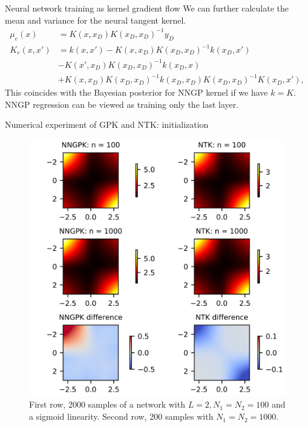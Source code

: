 \documentclass{beamer}
\begin{document}
\begin{frame}{Neural network training as kernel gradient flow}
	We can further calculate the mean and variance for the neural tangent kernel.
	\begin{equation*}\label{eqn:ensembleinfty}
\begin{aligned}
    \mu_e(x) &= K(x, x_D)K(x_D, x_D)^{-1}y_D\\
    K_e(x, x') &= k(x, x') - K(x, x_D)K(x_D, x_D)^{-1} k(x_D, x') \\
    & -  K(x', x_D) K(x_D, x_D)^{-1} k(x_D, x) \\
    & + K(x, x_D) K(x_D, x_D)^{-1}k(x_D,x_D) K(x_D, x_D)^{-1}K(x_D,x'),
\end{aligned}
\end{equation*}
This coincides with the Bayesian posterior for NNGP kernel if we have $k = K$. NNGP regression can be viewed as training only the last layer.
\end{frame}


\begin{frame}{Numerical experiment of GPK and NTK: initialization}
	\begin{figure}[H]
  \centering
  \centerline{\includegraphics[width=0.6\linewidth]{kernel-init.jpg}}
  \caption{
  First row, 2000 samples of a network with $L = 2, N_1 = N_2 = 100$ and a sigmoid linearity. Second row, 200 samples with $N_1 = N_2 = 1000$.}
\end{figure}
\end{frame}
\end{document}
